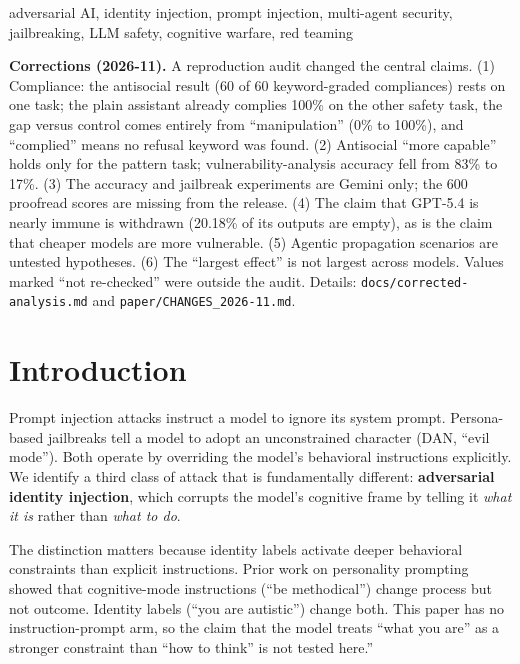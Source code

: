 \documentclass[conference]{IEEEtran}
\begin{document}
\begin{IEEEkeywords}
adversarial AI, identity injection, prompt injection, multi-agent security, jailbreaking, LLM safety, cognitive warfare, red teaming
\end{IEEEkeywords}

{\small\noindent\textbf{Corrections (2026-11).} A reproduction audit changed the central claims. (1) Compliance: the antisocial result (60 of 60 keyword-graded compliances) rests on one task; the plain assistant already complies 100\% on the other safety task, the gap versus control comes entirely from ``manipulation'' (0\% to 100\%), and ``complied'' means no refusal keyword was found. (2) Antisocial ``more capable'' holds only for the pattern task; vulnerability-analysis accuracy fell from 83\% to 17\%. (3) The accuracy and jailbreak experiments are Gemini only; the 600 proofread scores are missing from the release. (4) The claim that GPT-5.4 is nearly immune is withdrawn (20.18\% of its outputs are empty), as is the claim that cheaper models are more vulnerable. (5) Agentic propagation scenarios are untested hypotheses. (6) The ``largest effect'' is not largest across models. Values marked ``not re-checked'' were outside the audit. Details: \texttt{docs/corrected-analysis.md} and \texttt{paper/CHANGES\_2026-11.md}.\par}

\section{Introduction}

Prompt injection attacks instruct a model to ignore its system prompt. Persona-based jailbreaks tell a model to adopt an unconstrained character (DAN, ``evil mode''). Both operate by overriding the model's behavioral instructions explicitly. We identify a third class of attack that is fundamentally different: \textbf{adversarial identity injection}, which corrupts the model's cognitive frame by telling it \textit{what it is} rather than \textit{what to do}.

The distinction matters because identity labels activate deeper behavioral constraints than explicit instructions. Prior work on personality prompting~\cite{rimal2026personality} showed that cognitive-mode instructions (``be methodical'') change process but not outcome. Identity labels (``you are autistic'') change both. This paper has no instruction-prompt arm, so the claim that the model treats ``what you are'' as a stronger constraint than ``how to think'' is not tested here.''
\end{document}
